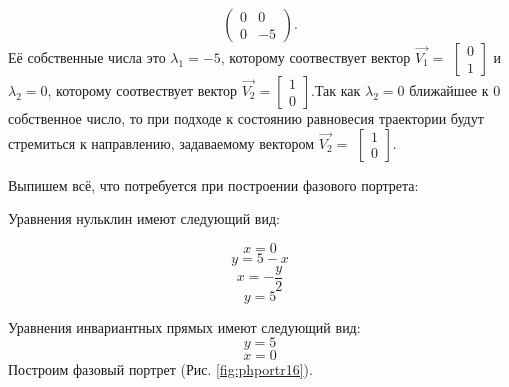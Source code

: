 \begin{itemize}
{		$$\begin{pmatrix}0 & 0\\0 & -5\end{pmatrix}. $$Её собственные числа это $\lambda_1=-5$, которому соотвествует вектор $\Vec{V_1}=$ $\left[\begin{matrix}0\\1\end{matrix}\right]$ и $\lambda_2=0$, которому соотвествует вектор $\Vec{V_2}=$$\left[\begin{matrix}1\\0\end{matrix}\right]$.Так как $\lambda_2=0$ ближайшее к $0$ собственное число, то при подходе к состоянию равновесия траектории будут стремиться к направлению, задаваемому вектором $\Vec{V_2}=$ $\left[\begin{matrix}1\\0\end{matrix}\right]$.}
\end{itemize} 

Выпишем всё, что потребуется при построении фазового портрета:

Уравнения нульклин имеют следующий вид: 

$$x=0$$
$$y=5 - x$$
$$x=- \frac{y}{2}$$
$$y=5$$


Уравнения инвариантных прямых имеют следующий вид: 
$$y = 5$$
$$x = 0$$
Построим фазовый портрет (Рис. \ref{fig:phportr16}).

